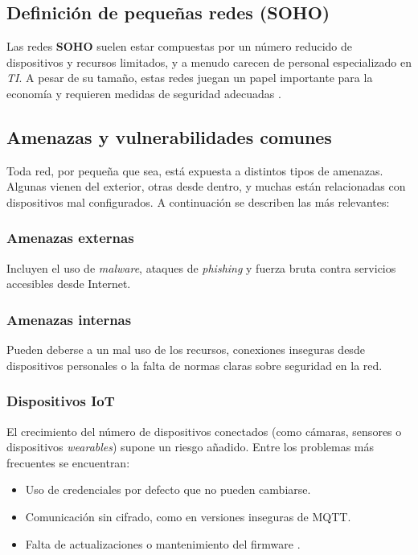 \documentclass[11pt,a4paper,twoside]{report}
\begin{document}
\subsection{Definición de pequeñas redes (SOHO)}

Las redes \textbf{SOHO} suelen estar compuestas por un número reducido de dispositivos y recursos limitados, y a menudo carecen de personal especializado en \textit{TI}. A pesar de su tamaño, estas redes juegan un papel importante para la economía y requieren medidas de seguridad adecuadas \cite{ruedarevisiting}.

\subsection{Amenazas y vulnerabilidades comunes}

Toda red, por pequeña que sea, está expuesta a distintos tipos de amenazas. Algunas vienen del exterior, otras desde dentro, y muchas están relacionadas con dispositivos mal configurados. A continuación se describen las más relevantes:

\subsubsection{Amenazas externas}

Incluyen el uso de \textit{malware}, ataques de \textit{phishing} y fuerza bruta contra servicios accesibles desde Internet.

\subsubsection{Amenazas internas}

Pueden deberse a un mal uso de los recursos, conexiones inseguras desde dispositivos personales o la falta de normas claras sobre seguridad en la red.

\subsubsection{Dispositivos IoT}

El crecimiento del número de dispositivos conectados (como cámaras, sensores o dispositivos \textit{wearables}) supone un riesgo añadido. Entre los problemas más frecuentes se encuentran:

\begin{itemize}
	\item Uso de credenciales por defecto que no pueden cambiarse.
	\item Comunicación sin cifrado, como en versiones inseguras de MQTT.
	\item Falta de actualizaciones o mantenimiento del firmware \cite{bakhshi2024review}.
\end{itemize}
\end{document}
